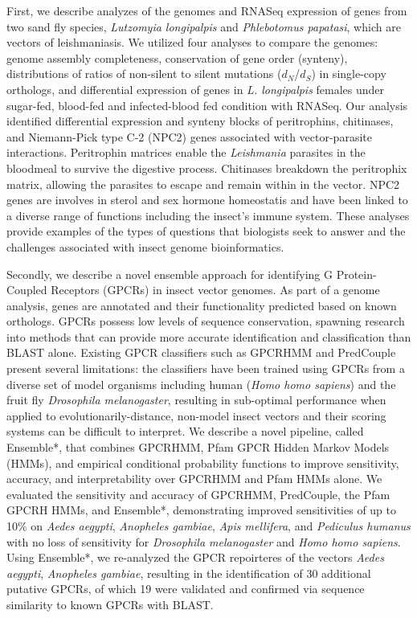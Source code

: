 First, we describe analyzes of the genomes and RNASeq expression of genes from two sand fly species, \emph{Lutzomyia longipalpis} and \emph{Phlebotomus papatasi}, which are vectors of leishmaniasis.  We utilized four analyses to compare the genomes: genome assembly completeness, conservation of gene order (synteny), distributions of ratios of non-silent to silent mutations ($d_N$/$d_S$) in single-copy orthologs, and differential expression of genes in \emph{L. longipalpis} females under sugar-fed, blood-fed and infected-blood fed condition with RNASeq.  Our analysis identified differential expression and synteny blocks of peritrophins, chitinases, and Niemann-Pick type C-2 (NPC2) genes associated with vector-parasite interactions. Peritrophin matrices enable the \emph{Leishmania} parasites in the bloodmeal to survive the digestive process.  Chitinases breakdown the peritrophix matrix, allowing the parasites to escape and remain within in the vector.  NPC2 genes are involves in sterol and sex hormone homeostatis and have been linked to a diverse range of functions including the insect's immune system. These analyses provide examples of the types of questions that biologists seek to answer and the challenges associated with insect genome bioinformatics.  

Secondly, we describe a novel ensemble approach for identifying G Protein-Coupled Receptors (GPCRs) in insect vector genomes.  As part of a genome analysis, genes are annotated and their functionality predicted based on known orthologs. GPCRs possess low levels of sequence conservation, spawning research into methods that can provide more accurate identification and classification than BLAST alone.  Existing GPCR classifiers such as GPCRHMM and PredCouple present several limitations: the classifiers have been trained using GPCRs from a diverse set of model organisms including human (\emph{Homo homo sapiens}) and the fruit fly \emph{Drosophila melanogaster}, resulting in sub-optimal performance when applied to evolutionarily-distance, non-model insect vectors and their scoring systems can be difficult to interpret.  We describe a novel pipeline, called Ensemble*, that combines GPCRHMM, Pfam GPCR Hidden Markov Models (HMMs), and empirical conditional probability functions to improve sensitivity, accuracy, and interpretability over GPCRHMM and Pfam HMMs alone. We evaluated the sensitivity and accuracy of GPCRHMM, PredCouple, the Pfam GPCRH HMMs, and Ensemble*, demonstrating improved sensitivities of up to 10\% on \emph{Aedes aegypti}, \emph{Anopheles gambiae}, \emph{Apis mellifera}, and \emph{Pediculus humanus} with no loss of sensitivity for \emph{Drosophila melanogaster} and \emph{Homo homo sapiens}. Using Ensemble*, we re-analyzed the GPCR repoirteres of the vectors \emph{Aedes aegypti}, \emph{Anopheles gambiae}, resulting in the identification of 30 additional putative GPCRs, of which 19 were validated and confirmed via sequence similarity to known GPCRs with BLAST.

